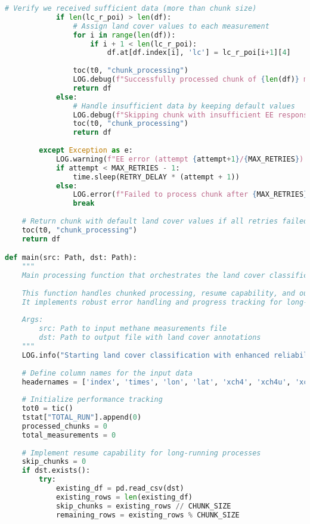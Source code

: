\begin{lstlisting}[language=Python, caption=Land Cover Classification Addition Algorithm, label=alg:step02_add_lc]
            # Verify we received sufficient data (more than chunk size)
            if len(lc_r_poi) > len(df):
                # Assign land cover values to each measurement
                for i in range(len(df)):
                    if i + 1 < len(lc_r_poi):
                        df.at[df.index[i], 'lc'] = lc_r_poi[i+1][4]
                
                toc(t0, "chunk_processing")
                LOG.debug(f"Successfully processed chunk of {len(df)} measurements, got {len(lc_r_poi)} EE responses")
                return df
            else:
                # Handle insufficient data by keeping default values
                LOG.debug(f"Skipping chunk with insufficient EE responses: got {len(lc_r_poi)}, expected > {len(df)}")
                toc(t0, "chunk_processing")
                return df
                    
        except Exception as e:
            LOG.warning(f"EE error (attempt {attempt+1}/{MAX_RETRIES}): {e}")
            if attempt < MAX_RETRIES - 1:
                time.sleep(RETRY_DELAY * (attempt + 1))
            else:
                LOG.error(f"Failed to process chunk after {MAX_RETRIES} attempts")
                break
    
    # Return chunk with default land cover values if all retries failed
    toc(t0, "chunk_processing")
    return df

def main(src: Path, dst: Path):
    """
    Main processing function that orchestrates the land cover classification workflow.
    
    This function handles chunked processing, resume capability, and output management.
    It implements robust error handling and progress tracking for long-running processes.
    
    Args:
        src: Path to input methane measurements file
        dst: Path to output file with land cover annotations
    """
    LOG.info("Starting land cover classification with enhanced reliability")
    
    # Define column names for the input data
    headernames = ['index', 'times', 'lon', 'lat', 'xch4', 'xch4u', 'xco', 'xcou']
    
    # Initialize performance tracking
    tot0 = tic()
    tstat["TOTAL_RUN"].append(0)
    processed_chunks = 0
    total_measurements = 0
    
    # Implement resume capability for long-running processes
    skip_chunks = 0
    if dst.exists():
        try:
            existing_df = pd.read_csv(dst)
            existing_rows = len(existing_df)
            skip_chunks = existing_rows // CHUNK_SIZE
            remaining_rows = existing_rows % CHUNK_SIZE
            

\end{lstlisting}
